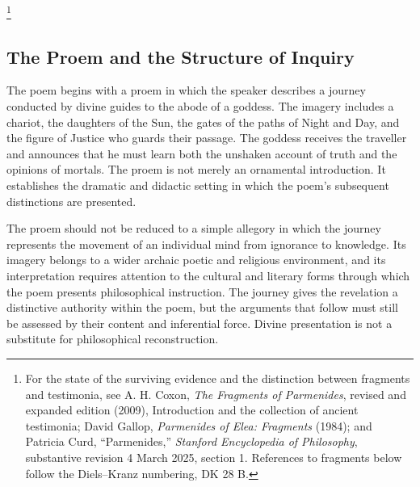 

\footnote{For the state of the surviving evidence and the distinction
between fragments and testimonia, see A. H. Coxon, \textit{The Fragments
of Parmenides}, revised and expanded edition (2009), Introduction and
the collection of ancient testimonia; David Gallop, \textit{Parmenides
of Elea: Fragments} (1984); and Patricia Curd, ``Parmenides,''
\textit{Stanford Encyclopedia of Philosophy}, substantive revision
4 March 2025, section 1. References to fragments below follow the
Diels--Kranz numbering, DK 28 B.}


\subsection{The Proem and the Structure of Inquiry}


The poem begins with a proem in which the speaker describes a
journey conducted by divine guides to the abode of a goddess.
The imagery includes a chariot, the daughters of the Sun, the
gates of the paths of Night and Day, and the figure of Justice
who guards their passage. The goddess receives the traveller
and announces that he must learn both the unshaken account of
truth and the opinions of mortals. The proem is not merely an
ornamental introduction. It establishes the dramatic and
didactic setting in which the poem's subsequent distinctions
are presented.


The proem should not be reduced to a simple allegory in which
the journey represents the movement of an individual mind from
ignorance to knowledge. Its imagery belongs to a wider archaic
poetic and religious environment, and its interpretation requires
attention to the cultural and literary forms through which the
poem presents philosophical instruction. The journey gives
the revelation a distinctive authority within the poem, but
the arguments that follow must still be assessed by their
content and inferential force. Divine presentation is not
a substitute for philosophical reconstruction.

